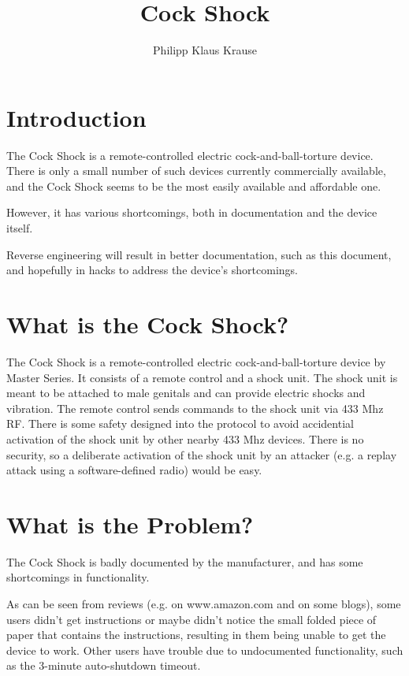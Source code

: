 \documentclass[a4paper]{article}
\begin{document}
\title{Cock Shock}
\author{Philipp Klaus Krause}

\maketitle

\section{Introduction}

The Cock Shock is a remote-controlled electric cock-and-ball-torture device. There is only a small number of such devices currently commercially available, and the Cock Shock seems to be the most easily available and affordable one.

However, it has various shortcomings, both in documentation and the device itself.

Reverse engineering will result in better documentation, such as this document, and hopefully in hacks to address the device's shortcomings.

\section{What is the Cock Shock?}

The Cock Shock is a remote-controlled electric cock-and-ball-torture device by Master Series. It consists of a remote control and a shock unit. The shock unit is meant to be attached to male genitals and can provide electric shocks and vibration. The remote control sends commands to the shock unit via 433 Mhz RF. There is some safety designed into the protocol to avoid accidential activation of the shock unit by other nearby 433 Mhz devices. There is no security, so a deliberate activation of the shock unit by an attacker (e.g. a replay attack using a software-defined radio) would be easy.

\section{What is the Problem?}

The Cock Shock is badly documented by the manufacturer, and has some shortcomings in functionality.

As can be seen from reviews (e.g. on www.amazon.com and on some blogs), some users didn't get instructions or maybe didn't notice the small folded piece of paper that contains the instructions, resulting in them being unable to get the device to work. Other users have trouble due to undocumented functionality, such as the 3-minute auto-shutdown timeout.
\end{document}
